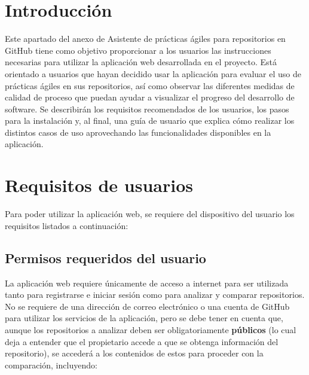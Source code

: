 
\section{Introducción}
Este apartado del anexo de Asistente de prácticas ágiles para repositorios en GitHub tiene como objetivo proporcionar a los usuarios las instrucciones necesarias para utilizar la aplicación web desarrollada en el proyecto. 
Está orientado a usuarios que hayan decidido usar la aplicación para evaluar el uso de prácticas ágiles en sus repositorios, así como observar las diferentes medidas de calidad de proceso que puedan ayudar a visualizar el progreso del desarrollo de software.
Se describirán los requisitos recomendados de los usuarios, los pasos para la instalación y, al final, una guía de usuario que explica cómo realizar los distintos casos de uso aprovechando las funcionalidades disponibles en la aplicación.

\section{Requisitos de usuarios}
Para poder utilizar la aplicación web, se requiere del dispositivo del usuario los requisitos listados a continuación:

\subsection*{Permisos requeridos del usuario}
La aplicación web requiere únicamente de acceso a internet para ser utilizada tanto para registrarse e iniciar sesión como para analizar y comparar repositorios.
No se requiere de una dirección de correo electrónico o una cuenta de GitHub para utilizar los servicios de la aplicación, pero se debe tener en cuenta que, aunque los repositorios a analizar deben ser obligatoriamente \textbf{públicos} (lo cual deja a entender que el propietario accede a que se obtenga información del repositorio), se accederá a los contenidos de estos para proceder con la comparación, incluyendo:

